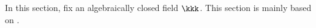 In this section, fix an algebraically closed field $\kkk$.
This section is mainly based on \cite[Chapter V.2]{Har77}.






